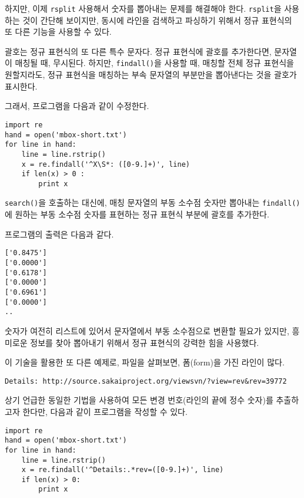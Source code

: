 하지만, 이제 {\tt rsplit} 사용해서 숫자를 뽑아내는 문제를 해결해야 한다.
{\tt rsplit}을 사용하는 것이 간단해 보이지만, 동시에 라인을 검색하고 파싱하기 위해서 정규 표현식의 또 다른 기능을 사용할 수 있다.


괄호는 정규 표현식의 또 다른 특수 문자다. 
정규 표현식에 괄호를 추가한다면, 문자열이 매칭될 때, 무시된다.
하지만, {\tt findall()}을 사용할 때, 매칭할 전체 정규 표현식을 원할지라도, 정규 표현식을 매칭하는 부속 문자열의 부분만을 뽑아낸다는 것을 괄호가 표시한다.


그래서, 프로그램을 다음과 같이 수정한다.

\beforeverb
\begin{verbatim}
import re
hand = open('mbox-short.txt')
for line in hand:
    line = line.rstrip()
    x = re.findall('^X\S*: ([0-9.]+)', line)
    if len(x) > 0 :
        print x
\end{verbatim}
\afterverb
%

{\tt search()}을 호출하는 대신에, 매칭 문자열의 부동 소수점 숫자만 뽑아내는 {\tt findall()}에 원하는 부동 소수점 숫자를 표현하는 정규 표현식 부분에 괄호를 추가한다.

프로그램의 출력은 다음과 같다.

\beforeverb
\begin{verbatim}
['0.8475']
['0.0000']
['0.6178']
['0.0000']
['0.6961']
['0.0000']
..
\end{verbatim}
\afterverb
%

숫자가 여전히 리스트에 있어서 문자열에서 부동 소수점으로 변환할 필요가 있지만, 흥미로운 정보를 찾아 뽑아내기 위해서 정규 표현식의 강력한 힘을 사용했다.

이 기술을 활용한 또 다른 예제로, 파일을 살펴보면, 폼(form)을 가진 라인이 많다.

\beforeverb
\begin{verbatim}
Details: http://source.sakaiproject.org/viewsvn/?view=rev&rev=39772
\end{verbatim}
\afterverb
%

상기 언급한 동일한 기법을 사용하여 모든 변경 번호(라인의 끝에 정수 숫자)를 추출하고자 한다만, 다음과 같이 프로그램을 작성할 수 있다.

\beforeverb
\begin{verbatim}
import re
hand = open('mbox-short.txt')
for line in hand:
    line = line.rstrip()
    x = re.findall('^Details:.*rev=([0-9.]+)', line)
    if len(x) > 0:
        print x
\end{verbatim}
\afterverb
%

